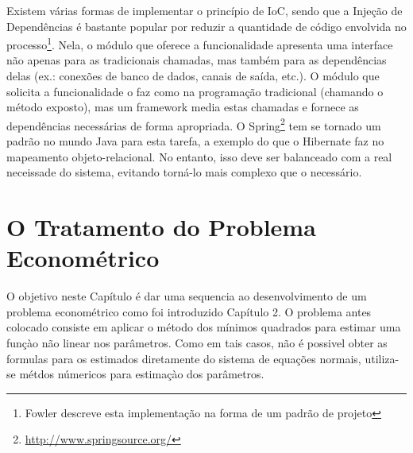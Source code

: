 \documentclass{abnt}
\begin{document}
Existem várias formas de implementar o princípio de IoC, sendo que a Injeção de Dependências é bastante popular por reduzir a quantidade de código envolvida no processo\footnote{Fowler descreve esta implementação na forma de um padrão de projeto\cite{FowlerInjdep}}. Nela, o módulo que oferece a funcionalidade apresenta uma interface não apenas para as tradicionais chamadas, mas também para as dependências delas (ex.: conexões de banco de dados, canais de saída, etc.). O módulo que solicita a funcionalidade o faz como na programação tradicional (chamando o método exposto), mas um framework media estas chamadas e fornece as dependências necessárias de forma apropriada. O Spring\footnote{\url{http://www.springsource.org/}} tem se tornado um padrão no mundo Java para esta tarefa, a exemplo do que o Hibernate faz no mapeamento objeto-relacional. No entanto, isso deve ser balanceado com a real neceissade do sistema, evitando torná-lo mais complexo que o necessário.










\chapter{O Tratamento do Problema Econométrico}

O objetivo neste Capítulo é dar uma sequencia ao desenvolvimento de um problema econométrico como foi introduzido Capítulo 2. O problema antes colocado consiste em aplicar o método dos mínimos quadrados para estimar uma funçào não linear nos parâmetros. Como em tais casos, não é possivel obter as formulas para os estimados diretamente do sistema de equações normais, utiliza-se métdos númericos para estimaçào dos parâmetros. 
\end{document}

